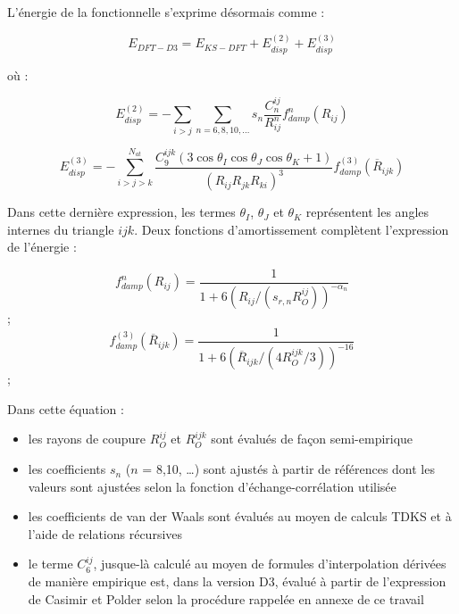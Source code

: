 \documentclass[12pt,a4paper]{book}
\begin{document}
{	L'énergie de la fonctionnelle s’exprime désormais comme :
	
	\begin{equation}
	E_{DFT-D3} = E_{KS-DFT} + E_{disp}^{(2)} + E_{disp}^{(3)}
	\end{equation}
	
	où : 
	
	\begin{equation}
	E_{disp}^{(2)}=- \sum_{i>j} \sum_{n=6,8,10,…} s_{n} \frac{C_{n}^{ij}}{R_{ij}^{n}} f_{damp}^{n} (R_{ij})
	\end{equation}
	
	\begin{equation}
	E_{disp}^{(3)}= -\sum_{i>j>k}^{N_{at}} \frac{C_{9}^{ijk}(3\cos\theta_{I}\cos\theta_{J}\cos\theta_{K}+ 1)}{(R_{ij} R_{jk} R_{ki})^{3}} f_{damp}^{(3)} (\overline{R}_{ijk})
	\end{equation}
	
	Dans cette dernière expression, les termes $\theta_{I}$, $\theta_{J}$ et $\theta_{K}$ représentent les angles internes du triangle $ijk$. Deux fonctions d'amortissement complètent l’expression de l’énergie :
	
	\begin{multicols}{2}
		\begin{equation} f_{damp}^{n} (R_{ij}) =\frac{1}{1+6(R_{ij} / (s_{r,n} R_{O}^{ij}))^{-\alpha_{n}}} \end{equation}   ;  
		\begin{equation} f_{damp}^{(3)} (\overline{R}_{ijk}) =\frac{1}{1+6(\overline{R}_{ijk} / (4 R_{O}^{ijk}/3))^{-16}}\end{equation}; 
	\end{multicols}
	
	Dans cette équation : 
	\begin{itemize}
	\item les rayons de coupure $R_{O}^{ij}$ et $R_{O}^{ijk}$ sont évalués de façon semi-empirique
	\item les coefficients $s_{n}$ ($n$ = 8,10, \dots) sont ajustés à partir de références dont les valeurs sont ajustées selon la fonction d’échange-corrélation utilisée
	\item les coefficients de van der Waals sont évalués au moyen de calculs TDKS et à l’aide de relations récursives
	\item le terme $C_{6}^{ij}$, jusque-là calculé au moyen de formules d’interpolation dérivées de manière empirique est, dans la version D3, évalué à partir de l’expression de Casimir et Polder selon la procédure rappelée en annexe de ce travail
	\end{itemize}
	
}
\end{document}
